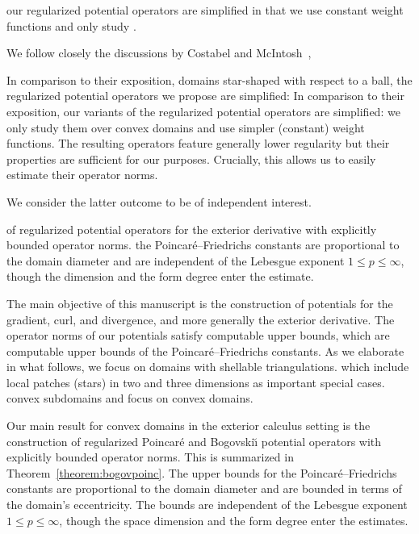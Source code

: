 our regularized potential operators are simplified in that we use constant weight functions and only study . 

We follow closely the discussions by Costabel and McIntosh~\cite{costabel2010bogovskiui},

In comparison to their exposition,  domains star-shaped with respect to a ball, 
the regularized potential operators we propose are simplified: 
In comparison to their exposition, our variants of the regularized potential operators are simplified:
we only study them over convex domains and use simpler (constant) weight functions. 
The resulting operators feature generally lower regularity but their properties are sufficient for our purposes. 
Crucially, this allows us to easily estimate their operator norms. 

We consider the latter outcome to be of independent interest. 

 of regularized potential operators for the exterior derivative with explicitly bounded operator norms.    the Poincar\'e--Friedrichs constants are proportional to the domain diameter and are independent of the Lebesgue exponent $1 \leq p \leq \infty$, though the  dimension and the form degree enter the estimate. 



The main objective of this manuscript is the construction of potentials for the gradient, curl, and divergence, and more generally the exterior derivative. The operator norms of our potentials satisfy computable upper bounds, which are computable upper bounds of the Poincar\'e--Friedrichs constants. As we elaborate in what follows, we focus on domains with shellable triangulations. which include local patches (stars) in two and three dimensions as important special cases. 
 convex subdomains and focus on  convex domains. 





Our main result for convex domains in the exterior calculus setting is the construction of regularized Poincar\'e and Bogovski\u{\i} potential operators with explicitly bounded operator norms. This is summarized in Theorem~\ref{theorem:bogovpoinc}. The  upper bounds for the Poincar\'e--Friedrichs constants are proportional to the domain diameter and are bounded in terms of the domain's eccentricity. The bounds are independent of the Lebesgue exponent $1 \leq p \leq \infty$, though the space dimension and the form degree enter the estimates. 

